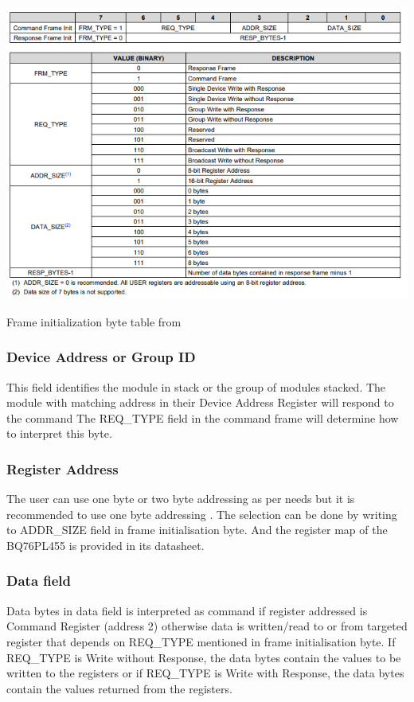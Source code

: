 \begin{table}[H]
  \centering
  
  \includegraphics[]{Chapter4/Tables/frameinitbyte.PNG}
  \caption{Frame initialization byte table from \cite{ti:pl455}}
\end{table}

\subsubsection{Device Address or Group ID}
This field identifies the module in stack or the group of modules stacked. The module with matching address in their Device Address Register \cite{ti:pl455} will respond to the command The REQ\_TYPE field in the command frame will determine how to interpret this byte.

\subsubsection{Register Address}
The user can use one byte or two byte addressing as per needs but it is recommended to use one byte addressing \cite{ti:pl455}. The selection can be done by writing to ADDR\_SIZE field in frame initialisation byte. And the register map of the BQ76PL455 is provided in its datasheet\cite{ti:pl455}.

\subsubsection{Data field}
Data bytes in data field is interpreted as command if register addressed is Command Register (address 2) otherwise data is written/read to or from targeted register that depends on REQ\_TYPE mentioned in frame initialisation byte. If REQ\_TYPE is Write without Response, the data bytes contain the values to be written to the registers
or if REQ\_TYPE is Write with Response, the data bytes contain the values returned from the registers.

